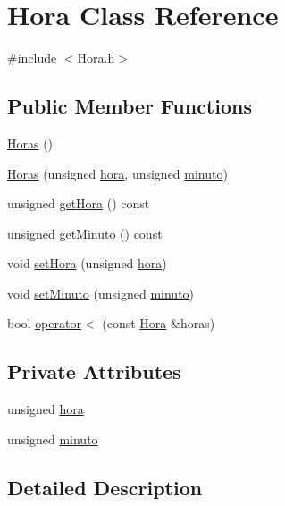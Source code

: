 \hypertarget{class_hora}{\section{Hora Class Reference}
\label{class_hora}
}


{\ttfamily \#include $<$Hora.\+h$>$}

\subsection*{Public Member Functions}
\begin{DoxyCompactItemize}
\item 
\hyperlink{class_hora_af1b32f81893707ace3cfcec7900f78a0}{Horas} ()
\item 
\hyperlink{class_hora_a610d00d405cfd4547fdf61de7f901605}{Horas} (unsigned \hyperlink{class_hora_ab901e62ae1158965687dc736a45ee8fe}{hora}, unsigned \hyperlink{class_hora_a9d33ce2d8a3f4b3d05b2a3c6df782fa4}{minuto})
\item 
unsigned \hyperlink{class_hora_ae55080cc8706bcbf135036edcc4112a5}{get\+Hora} () const 
\item 
unsigned \hyperlink{class_hora_adccaf5d0c9e674462f77b31ae05bdb86}{get\+Minuto} () const 
\item 
void \hyperlink{class_hora_afc47b74f8d5673565ebe3de1bbfb92a6}{set\+Hora} (unsigned \hyperlink{class_hora_ab901e62ae1158965687dc736a45ee8fe}{hora})
\item 
void \hyperlink{class_hora_abca266485eb34d8feaf1f9e84854a7f3}{set\+Minuto} (unsigned \hyperlink{class_hora_a9d33ce2d8a3f4b3d05b2a3c6df782fa4}{minuto})
\item 
bool \hyperlink{class_hora_a24d925d0c6d35e813542346e5d63eef9}{operator$<$} (const \hyperlink{class_hora}{Hora} \&horas)
\end{DoxyCompactItemize}
\subsection*{Private Attributes}
\begin{DoxyCompactItemize}
\item 
unsigned \hyperlink{class_hora_ab901e62ae1158965687dc736a45ee8fe}{hora}
\item 
unsigned \hyperlink{class_hora_a9d33ce2d8a3f4b3d05b2a3c6df782fa4}{minuto}
\end{DoxyCompactItemize}


\subsection{Detailed Description}


